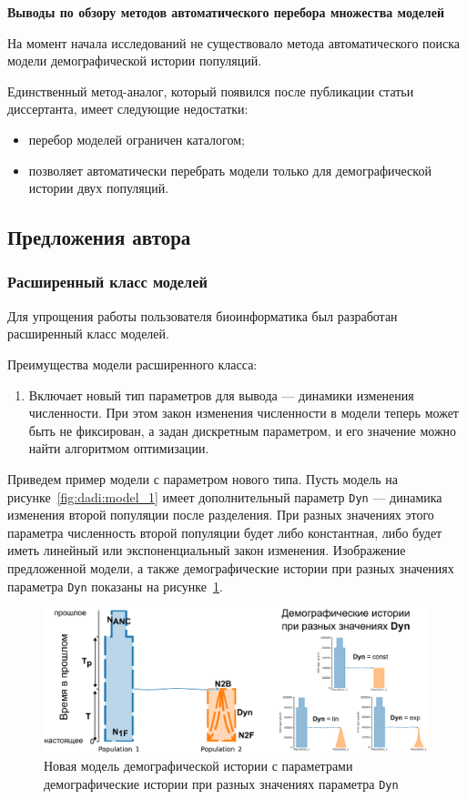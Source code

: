 \documentclass[a4paper,14pt,oneside,openany,article]{memoir}
\begin{document}
\textbf{Выводы по обзору методов автоматического перебора множества моделей}

На момент начала исследований не существовало метода автоматического поиска модели демографической истории популяций.

Единственный метод-аналог, который появился после публикации статьи диссертанта, имеет следующие недостатки:
\begin{itemize}
    \item перебор моделей ограничен каталогом;
    \item позволяет автоматически перебрать модели только для демографической истории двух популяций.
\end{itemize}

\subsection*{Предложения автора}
\subsubsection*{Расширенный класс моделей}
Для упрощения работы пользователя биоинформатика был разработан расширенный класс моделей. 

Преимущества модели расширенного класса:
\begin{enumerate}
    \item Включает новый тип параметров для вывода --- динамики изменения численности. При этом закон изменения численности в модели теперь может быть не фиксирован, а задан дискретным параметром, и его значение можно найти алгоритмом оптимизации.
\end{enumerate}

Приведем пример модели с параметром нового типа. Пусть модель на рисунке~\ref{fig:dadi:model_1} имеет дополнительный параметр \texttt{Dyn} --- динамика изменения второй популяции после разделения.
При разных значениях этого параметра численность второй популяции будет либо константная, либо будет иметь линейный или экспоненциальный закон изменения.
Изображение предложенной модели, а также демографические истории при разных значениях параметра \texttt{Dyn} показаны на рисунке~\ref{fig:new_model:model}.
\begin{figure}[h]
    \centering
    \includegraphics[width=\linewidth]{images_2/picture_2pops_model_3.pdf}
    \caption{Новая модель демографической истории с параметрами демографические истории при разных значениях параметра \texttt{Dyn}}
    \label{fig:new_model:model}
\end{figure}
\end{document}

